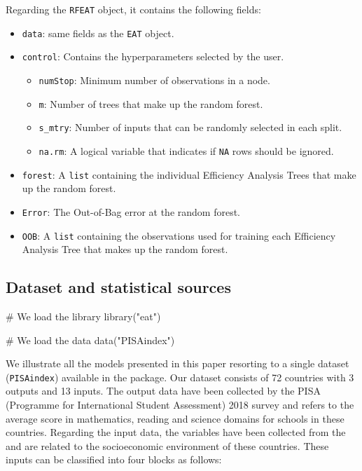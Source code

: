Regarding the \texttt{RFEAT} object, it contains the following fields:

\begin{itemize}
\item
  \texttt{data}: same fields as the \texttt{EAT} object.
\item
  \texttt{control}: Contains the hyperparameters selected by the user.

  \begin{itemize}
  \tightlist
  \item
    \texttt{numStop}: Minimum number of observations in a node.
  \item
    \texttt{m}: Number of trees that make up the random forest.
  \item
    \texttt{s\_mtry}: Number of inputs that can be randomly selected in
    each split.
  \item
    \texttt{na.rm}: A logical variable that indicates if \texttt{NA}
    rows should be ignored.
  \end{itemize}
\item
  \texttt{forest}: A \texttt{list} containing the individual Efficiency
  Analysis Trees that make up the random forest.
\item
  \texttt{Error}: The Out-of-Bag error at the random forest.
\item
  \texttt{OOB}: A \texttt{list} containing the observations used for
  training each Efficiency Analysis Tree that makes up the random
  forest.
\end{itemize}

\hypertarget{section3.1}{%
\subsection{Dataset and statistical sources}\label{section3.1}}

\begin{Schunk}
\begin{Sinput}
# We load the library
library("eat")

# We load the data
data("PISAindex")
\end{Sinput}
\end{Schunk}

We illustrate all the models presented in this paper resorting to a
single dataset (\texttt{PISAindex}) available in the  package.
Our dataset consists of 72 countries with 3 outputs and 13 inputs. The
output data have been collected by the PISA (Programme for International
Student Assessment) 2018 survey \citep{oecd2018} and refers to the
average score in mathematics, reading and science domains for schools in
these countries. Regarding the input data, the variables have been
collected from the \citet{SocialProgressIndex} and are related to the
socioeconomic environment of these countries. These inputs can be
classified into four blocks as follows:

